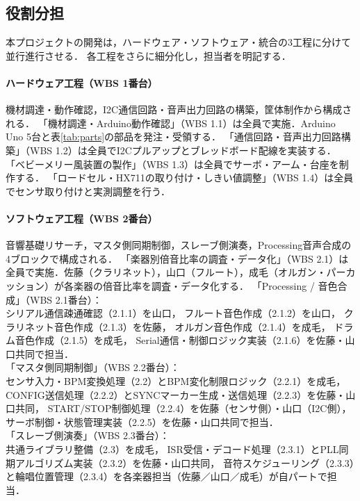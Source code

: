 \documentclass[lualatex,book,paper=a4paper,jafontsize=11.5pt,jafontscale=1.05]{jlreq}
\begin{document}
\clearpage
\subsection{役割分担}
本プロジェクトの開発は，ハードウェア・ソフトウェア・統合の3工程に分けて並行進行させる．
各工程をさらに細分化し，担当者を明記する．

\paragraph{ハードウェア工程（WBS 1番台）}
機材調達・動作確認，I2C通信回路・音声出力回路の構築，筐体制作から構成される．
「機材調達・Arduino動作確認」（WBS 1.1）は全員で実施．Arduino Uno 5台と表\ref{tab:parts}の部品を発注・受領する．
「通信回路・音声出力回路構築」（WBS 1.2）は全員でI2Cプルアップとブレッドボード配線を実装する．
「ベビーメリー風装置の製作」（WBS 1.3）は全員でサーボ・アーム・台座を制作する．
「ロードセル・HX711の取り付け・しきい値調整」（WBS 1.4）は全員でセンサ取り付けと実測調整を行う．

\paragraph{ソフトウェア工程（WBS 2番台）}
音響基礎リサーチ，マスタ側同期制御，スレーブ側演奏，Processing音声合成の4ブロックで構成される．
「楽器別倍音比率の調査・データ化」（WBS 2.1）は全員で実施．佐藤（クラリネット），山口（フルート），成毛（オルガン・パーカッション）が各楽器の倍音比率を調査・データ化する．
「Processing / 音色合成」（WBS 2.1番台）：\\
シリアル通信疎通確認（2.1.1）を山口，
フルート音色作成（2.1.2）を山口，
クラリネット音色作成（2.1.3）を佐藤，
オルガン音色作成（2.1.4）を成毛，
ドラム音色作成（2.1.5）を成毛，
Serial通信・制御ロジック実装（2.1.6）を佐藤・山口共同で担当．\\
「マスタ側同期制御」（WBS 2.2番台）：\\
センサ入力・BPM変換処理（2.2）とBPM変化制限ロジック（2.2.1）を成毛，
CONFIG送信処理（2.2.2）とSYNCマーカー生成・送信処理（2.2.3）を佐藤・山口共同，
START/STOP制御処理（2.2.4）を佐藤（センサ側）・山口（I2C側），
サーボ制御・状態管理実装（2.2.5）を佐藤・山口共同で担当．\\
「スレーブ側演奏」（WBS 2.3番台）：\\
共通ライブラリ整備（2.3）を成毛，
ISR受信・デコード処理（2.3.1）とPLL同期アルゴリズム実装（2.3.2）を佐藤・山口共同，
音符スケジューリング（2.3.3）と輪唱位置管理（2.3.4）を各楽器担当（佐藤／山口／成毛）が自パートで担当．
\end{document}
